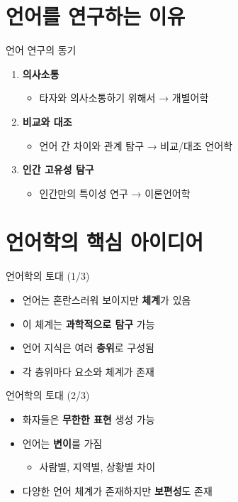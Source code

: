 \documentclass[aspectratio=169]{beamer}
\begin{document}
\section{언어를 연구하는 이유}

\begin{frame}{언어 연구의 동기}
\begin{enumerate}
\item \textbf{의사소통}
    \begin{itemize}
    \item 타자와 의사소통하기 위해서 → 개별어학
    \end{itemize}
\vspace{0.3cm}
\item \textbf{비교와 대조}
    \begin{itemize}
    \item 언어 간 차이와 관계 탐구 → 비교/대조 언어학
    \end{itemize}
\vspace{0.3cm}
\item \textbf{인간 고유성 탐구}
    \begin{itemize}
    \item 인간만의 특이성 연구 → 이론언어학
    \end{itemize}
\end{enumerate}
\end{frame}

\section{언어학의 핵심 아이디어}

\begin{frame}{언어학의 토대 (1/3)}
\begin{itemize}
\item 언어는 혼란스러워 보이지만 \textbf{체계}가 있음
\item 이 체계는 \textbf{과학적으로 탐구} 가능
\item 언어 지식은 여러 \textbf{층위}로 구성됨
\item 각 층위마다 요소와 체계가 존재
\end{itemize}
\end{frame}

\begin{frame}{언어학의 토대 (2/3)}
\begin{itemize}
\item 화자들은 \textbf{무한한 표현} 생성 가능
\item 언어는 \textbf{변이}를 가짐
    \begin{itemize}
    \item 사람별, 지역별, 상황별 차이
    \end{itemize}
\item 다양한 언어 체계가 존재하지만 \textbf{보편성}도 존재
\end{itemize}
\end{frame}
\end{document}
